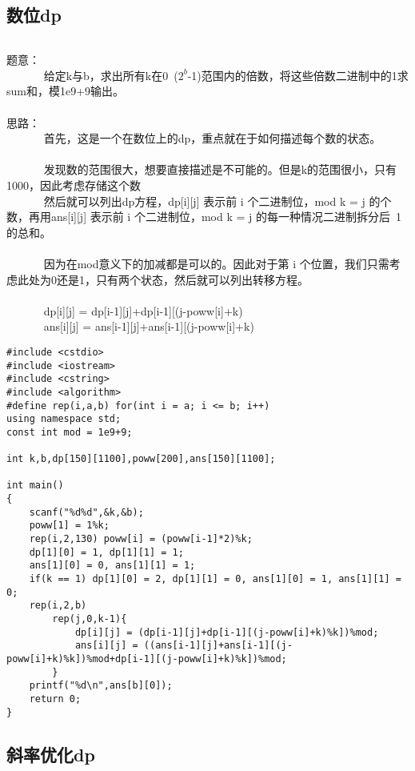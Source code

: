 \documentclass[twoside]{article}
\begin{document}
\subsection{数位dp}
\begin{lstlisting}
\end{lstlisting}
题意：\\
        给定k与b，求出所有k在0~($2^b$-1)范围内的倍数，将这些倍数二进制中的1求sum和，模1e9+9输出。\\
\\
思路：\\
        首先，这是一个在数位上的dp，重点就在于如何描述每个数的状态。\\
\\
        发现数的范围很大，想要直接描述是不可能的。但是k的范围很小，只有1000，因此考虑存储这个数%
\\
        然后就可以列出dp方程，dp[i][j] 表示前 i 个二进制位，mod k = j 的个数，再用ans[i][j] 表示前 i 个二进制位，mod k = j 的每一种情况二进制拆分后 1 的总和。\\
\\
        因为在mod意义下的加减都是可以的。因此对于第 i 个位置，我们只需考虑此处为0还是1，只有两个状态，然后就可以列出转移方程。\\
\\
        dp[i][j] = dp[i-1][j]+dp[i-1][(j-poww[i]+k)%
\\
        ans[i][j] = ans[i-1][j]+ans[i-1][(j-poww[i]+k)%
\begin{lstlisting}
#include <cstdio>
#include <iostream>
#include <cstring>
#include <algorithm>
#define rep(i,a,b) for(int i = a; i <= b; i++)
using namespace std;
const int mod = 1e9+9;
 
int k,b,dp[150][1100],poww[200],ans[150][1100];
 
int main()
{
	scanf("%d%d",&k,&b);
	poww[1] = 1%k;
	rep(i,2,130) poww[i] = (poww[i-1]*2)%k;
	dp[1][0] = 1, dp[1][1] = 1;
	ans[1][0] = 0, ans[1][1] = 1;
	if(k == 1) dp[1][0] = 2, dp[1][1] = 0, ans[1][0] = 1, ans[1][1] = 0;
	rep(i,2,b)
		rep(j,0,k-1){
			dp[i][j] = (dp[i-1][j]+dp[i-1][(j-poww[i]+k)%k])%mod;
			ans[i][j] = ((ans[i-1][j]+ans[i-1][(j-poww[i]+k)%k])%mod+dp[i-1][(j-poww[i]+k)%k])%mod;
		}
	printf("%d\n",ans[b][0]);
	return 0;
}\end{lstlisting}
\subsection{斜率优化dp}
\end{document}
